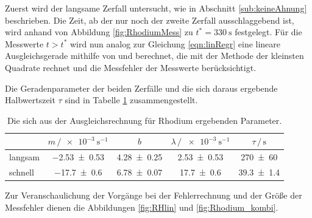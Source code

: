 Zuerst wird der langsame Zerfall untersucht, wie in Abschnitt \ref{sub:keineAhnung} beschrieben. 
Die Zeit, ab der nur noch der zweite Zerfall ausschlaggebend ist, wird anhand von Abbildung \ref{fig:RhodiumMess} zu $t^*=\SI{330}{\second}$ festgelegt.
Für die Messwerte $t>t^*$ wird nun analog zur Gleichung \eqref{eqn:linRegr} eine lineare Ausgleichsgerade mithilfe von 
\cite{scipy} und \cite{uncertainties} berechnet, die mit der Methode der kleinsten Quadrate rechnet und die Messfehler der Messwerte berücksichtigt. 

Die Geradenparameter der beiden Zerfälle und die sich daraus ergebende Halbwertszeit $\tau$ sind in Tabelle \ref{tab:Denkdirwasaus} zusammengestellt. 
\begin{table}
    \centering
    \caption{Die sich aus der Ausgleichsrechnung für Rhodium ergebenden Parameter.}
    \label{tab:Denkdirwasaus}
    \begin{tabular}{l c c c c}
        \toprule
         & $m\,/\SI{e-3}{\second\tothe{-1}}$ & $b$ & $\lambda\,/\,\SI{e-3}{\second\tothe{-1}}$ & $\tau\,/\,\si{\second}$ \\
        \midrule
        langsam & \num{-2.53+-0.53} & \num{4.28+-0.25} & \num{2.53+-0.53} & \num{270+-60}   \\
        schnell & \num{-17.7+-0.6}  & \num{6.78+-0.07} & \num{17.7+-0.6}  & \num{39.3+-1.4} \\
        \bottomrule
    \end{tabular}
\end{table}
Zur Veranschaulichung der Vorgänge bei der Fehlerrechnung und der Größe der Messfehler dienen die Abbildungen \ref{fig:RHlin} und \ref{fig:Rhodium_kombi}. 
